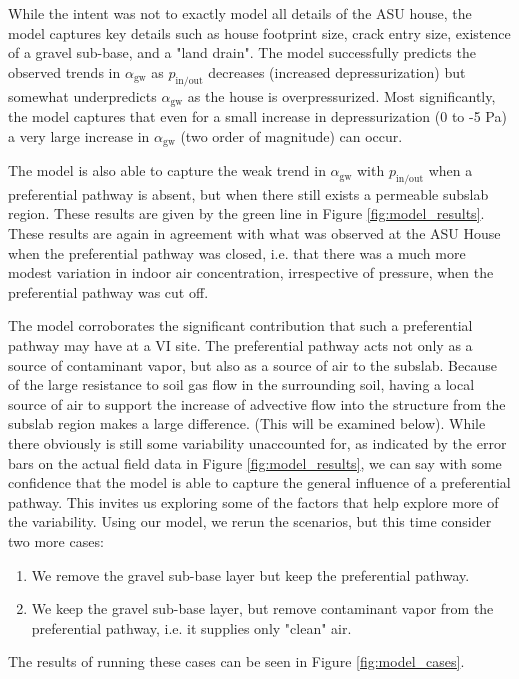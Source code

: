 While the intent was not to exactly model all details of the ASU house, the model captures key details such as house footprint size, crack entry size, existence of a gravel sub-base, and a "land drain".
The model successfully predicts the observed trends in $\alpha_\mathrm{gw}$ as $p_\mathrm{in/out}$ decreases (increased depressurization) but somewhat underpredicts $\alpha_\mathrm{gw}$ as the house is overpressurized.
Most significantly, the model captures that even for a small increase in depressurization (0 to -5 Pa) a very large increase in $\alpha_\mathrm{gw}$ (two order of magnitude) can occur.\par

The model is also able to capture the weak trend in $\alpha_\mathrm{gw}$ with $p_\mathrm{in/out}$ when a preferential pathway is absent, but when there still exists a permeable subslab region.
These results are given by the green line in Figure \ref{fig:model_results}.  
These results are again in agreement with what was observed at the ASU House when the preferential pathway was closed, i.e. that there was a much more modest variation in indoor air concentration, irrespective of pressure, when the preferential pathway was cut off.\par

The model corroborates the significant contribution that such a preferential pathway may have at a VI site.
The preferential pathway acts not only as a source of contaminant vapor, but also  as a source of air to the subslab.
Because of the large resistance to soil gas flow in the surrounding soil, having a local source of air to support the increase of advective flow into the structure from the subslab region makes a large difference.
(This will be examined below).
While there obviously is still some variability unaccounted for, as indicated by the error bars on the actual field data in Figure \ref{fig:model_results}, we can say with some confidence that the model is able to capture the general influence of a preferential pathway.
This invites us exploring some of the factors that help explore more of the variability.
Using our model, we rerun the scenarios, but this time consider two more cases:
\begin{enumerate}
  \item We remove the gravel sub-base layer but keep the preferential pathway.
  \item We keep the gravel sub-base layer, but remove contaminant vapor from the preferential pathway, i.e. it supplies only "clean" air.
\end{enumerate}
The results of running these cases can be seen in Figure \ref{fig:model_cases}.\par

